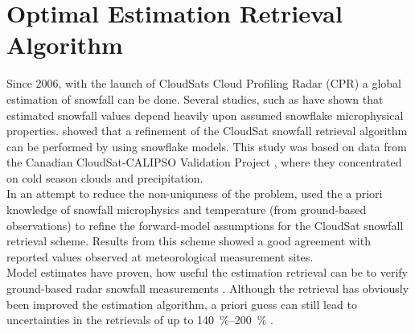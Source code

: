 \section{Optimal Estimation Retrieval Algorithm} %
\label{sec:retrieval}
Since 2006, with the launch of CloudSats Cloud Profiling Radar (CPR) a global estimation of snowfall can be done. Several studies, such as \cite{kulie_utilizing_2009} have shown that estimated snowfall values depend heavily upon assumed snowflake microphysical properties.
\cite{wood_microphysical_2015} showed that a refinement of the CloudSat snowfall retrieval algorithm can be performed by using snowflake models. 
This study was based on data from the Canadian CloudSat-CALIPSO Validation Project \citep[C3VP,][]{hudak_canadian_2006}, where they concentrated on cold season clouds and precipitation.
\\
\noindent In an attempt to reduce the non-uniquness of the problem, \cite{wood_microphysical_2015} used the a priori knowledge of snowfall microphysics and temperature (from ground-based observations) to refine the forward-model assumptions for the CloudSat snowfall retrieval scheme. 
Results from this scheme showed a good agreement with reported values observed at meteorological measurement sites. \\
Model estimates have proven, how useful the estimation retrieval can be to verify ground-based radar snowfall measurements \citep{norin_intercomparison_2015}.
Although the retrieval has obviously been improved the estimation algorithm, a priori guess can still lead to uncertainties in the retrievals of up to \SIrange{140}{200}{\percent} \citep{wood_estimation_2011}. 
\\
